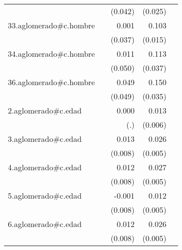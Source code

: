 {\begin{longtable}{l*{4}{D{.}{.}{-1}}}
            &                     &     (0.042)         &     (0.025)         &                     \\
\addlinespace
33.aglomerado#c.hombre&                     &       0.001         &       0.103\sym{***}&                     \\
            &                     &     (0.037)         &     (0.015)         &                     \\
\addlinespace
34.aglomerado#c.hombre&                     &       0.011         &       0.113\sym{**} &                     \\
            &                     &     (0.050)         &     (0.037)         &                     \\
\addlinespace
36.aglomerado#c.hombre&                     &       0.049         &       0.150\sym{***}&                     \\
            &                     &     (0.049)         &     (0.035)         &                     \\
\addlinespace
2.aglomerado#c.edad&                     &       0.000         &       0.013\sym{*}  &                     \\
            &                     &         (.)         &     (0.006)         &                     \\
\addlinespace
3.aglomerado#c.edad&                     &       0.013         &       0.026\sym{***}&                     \\
            &                     &     (0.008)         &     (0.005)         &                     \\
\addlinespace
4.aglomerado#c.edad&                     &       0.012         &       0.027\sym{***}&                     \\
            &                     &     (0.008)         &     (0.005)         &                     \\
\addlinespace
5.aglomerado#c.edad&                     &      -0.001         &       0.012\sym{*}  &                     \\
            &                     &     (0.008)         &     (0.005)         &                     \\
\addlinespace
6.aglomerado#c.edad&                     &       0.012         &       0.026\sym{***}&                     \\
            &                     &     (0.008)         &     (0.005)         &                     \\

\end{longtable}}
